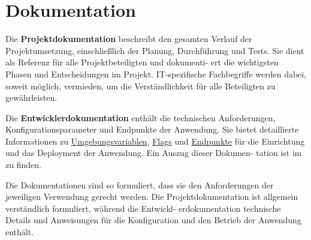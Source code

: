 \section{Dokumentation}
\label{sec:Dokumentation}

Die \textbf{Projektdokumentation} beschreibt den gesamten Verlauf der Projektumsetzung, einschließlich der Planung, Durchführung und Tests. Sie dient als Referenz für alle Projektbeteiligten und dokumenti-
ert die wichtigsten Phasen und Entscheidungen im Projekt. IT-spezifische Fachbegriffe werden dabei, soweit möglich, vermieden, um die Verständlichkeit für alle Beteiligten zu gewährleisten.

Die \textbf{Entwicklerdokumentation} enthält die technischen Anforderungen, Konfigurationsparameter und Endpunkte der Anwendung. Sie bietet detaillierte Informationen zu \hyperlink{Umgebungsvariablen}{\textcolor{AOBlau}{Umgebungsvariablen}}, \hyperlink{Flags}{\textcolor{AOBlau}{Flags}} und \hyperlink{Endpoints}{\textcolor{AOBlau}{Endpunkte}} für die Einrichtung und das Deployment der Anwendung. Ein Auszug dieser Dokumen-
tation ist im  zu finden.

Die Dokumentationen sind so formuliert, dass sie den Anforderungen der jeweiligen Verwendung gerecht werden. Die Projektdokumentation ist allgemein verständlich formuliert, während die Entwickl-
erdokumentation technische Details und Anweisungen für die Konfiguration und den Betrieb der Anwendung enthält.
